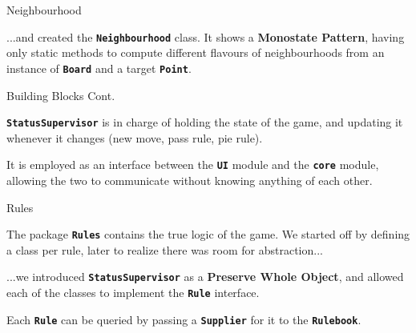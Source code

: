 \documentclass{beamer}
\begin{document}
  \begin{frame} {Neighbourhood}

    ...and created the \textbf{\texttt{Neighbourhood}} class. It shows a \textbf{Monostate Pattern}, having only static methods to compute different flavours of neighbourhoods from an instance of \textbf{\texttt{Board}} and a target \textbf{\texttt{Point}}.

  \end{frame}



  \begin{frame} {Building Blocks Cont.}

    \textbf{\texttt{StatusSupervisor}} is in charge of holding the state of the game, and updating it whenever it changes (new move, pass rule, pie rule).

    \vspace{1em}

    It is employed as an interface between the \textbf{\texttt{UI}} module and the \textbf{\texttt{core}} module, allowing the two to communicate without knowing anything of each other.

  \end{frame}



  \begin{frame} {Rules}

    The package \textbf{\texttt{Rules}} contains the true logic of the game. We started off by defining a class per rule, later to realize there was room for abstraction...

    \vspace{1em}

    ...we introduced \textbf{\texttt{StatusSupervisor}} as a \textbf{Preserve Whole Object}, and allowed each of the classes to implement the \textbf{\texttt{Rule}} interface.

    \vspace{1em}

    Each \textbf{\texttt{Rule}} can be queried by passing a \textbf{\texttt{Supplier}} for it to the \textbf{\texttt{Rulebook}}.

  \end{frame}
\end{document}
